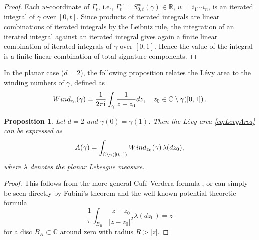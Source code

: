 \documentclass[10pt,a4paper]{amsart}
\newcommand{\val}[1]{\textcolor{blue}{#1}}
\newtheorem{proposition}[theorem]{Proposition}
\newcommand{\R}{\mathbb{R}}
\begin{document}
\begin{proof}
Each $w$-coordinate of $\Gamma_t$, i.e., $\Gamma_t^w = S^w_{0,t}(\gamma) \in \R$, $w = i_1\cdots i_n$,
is an iterated integral of $ \gamma $ over $[0,t] $. Since products of iterated integrals are linear combinations of iterated integrals by the Leibniz rule, the integration of an iterated integral against an iterated integral gives again a finite linear combination of iterated integrals of $ \gamma $ over $ [0,1] $. Hence the value of the integral is a finite linear combination of total signature components.
\end{proof}




In the planar case ($d = 2$), the following proposition relates the Lévy area to the winding numbers of $\gamma$, defined as  
$$\textnormal{Wind}_{z_0}(\gamma) = \frac{1}{2 \pi \mathrm{i}} \int_{\gamma} \frac{1}{z-z_0} d z , \quad z_0 \in \mathbb{C} \setminus \gamma([0,1]) \, .$$
\begin{proposition}\label{prop:levyarea_winding}
Let $d=2$ and $\gamma(0)=\gamma(1)$. Then the Lévy area \eqref{eq:LevyArea} can be expressed as  
\begin{equation}\label{eq:LevyvsWinding}
    A(\gamma) = \int_{\mathbb{C} \setminus \gamma([0,1])}  \textnormal{Wind}_{z_0}(\gamma) \, \lambda(dz_0),
\end{equation}
where $\lambda$ denotes the planar Lebesgue measure. 
\end{proposition}
\begin{proof}
This follows from the more general Cufí--Verdera  formula  \cite[Theorem 1]{CV2015}, or can simply be seen directly by Fubini's theorem and the well-known potential-theoretic formula
$$
\frac{1}{\pi} \int_{B_R} \frac{z-z_0}{{|z-z_0|}^2} \lambda(dz_0)  = z
$$
for a disc $B_R \subset \mathbb{C}$ around zero with radius $ R > |z|$.
\end{proof}
\end{document}
